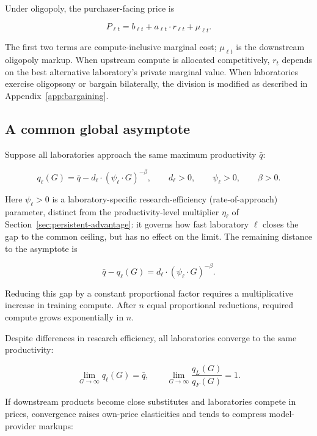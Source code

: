 \documentclass[11pt]{article}
\begin{document}
Under oligopoly, the purchaser-facing price is

\begin{equation}P_{\ell t}=b_{\ell t}+a_{\ell t}\cdot r_{\ell t}+\mu_{\ell t}.\end{equation}

The first two terms are compute-inclusive marginal cost; $\mu_{\ell t}$ is the downstream oligopoly markup. When upstream compute is allocated competitively, $r_t$ depends on the best alternative laboratory's private marginal value. When laboratories exercise oligopsony or bargain bilaterally, the division is modified as described in Appendix~\ref{app:bargaining}.

\subsection{A common global asymptote}
\label{subsec:common-asymptote}

Suppose all laboratories approach the same maximum productivity $\bar q$:

\begin{equation}q_\ell(G)=\bar q-d_\ell\cdot(\psi_\ell\cdot G)^{-\beta},\qquad d_\ell>0,\qquad \psi_\ell>0,\qquad \beta>0.\end{equation}

Here $\psi_\ell>0$ is a laboratory-specific research-efficiency (rate-of-approach) parameter, distinct from the productivity-level multiplier $\eta_\ell$ of Section~\ref{sec:persistent-advantage}: it governs how fast laboratory $\ell$ closes the gap to the common ceiling, but has no effect on the limit. The remaining distance to the asymptote is

\begin{equation}\bar q-q_\ell(G)=d_\ell\cdot(\psi_\ell\cdot G)^{-\beta}.\end{equation}

Reducing this gap by a constant proportional factor requires a multiplicative increase in training compute. After $n$ equal proportional reductions, required compute grows exponentially in $n$.

Despite differences in research efficiency, all laboratories converge to the same productivity:

\begin{equation}\lim_{G\rightarrow\infty}q_\ell(G)=\bar q,\qquad \lim_{G\rightarrow\infty}\frac{q_L(G)}{q_F(G)}=1.\end{equation}

If downstream products become close substitutes and laboratories compete in prices, convergence raises own-price elasticities and tends to compress model-provider markups:
\end{document}
